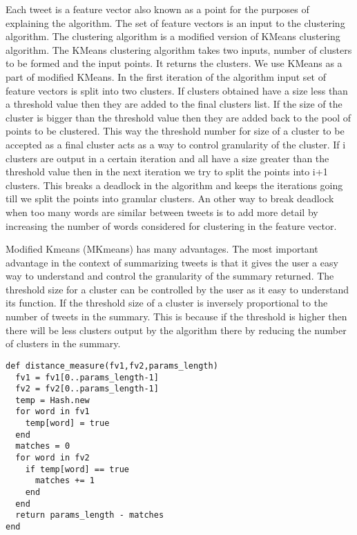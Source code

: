 Each tweet is a feature vector also known as a point for the purposes of explaining the algorithm. The set of feature vectors is an input to the clustering algorithm. The clustering algorithm is a modified version of KMeans clustering algorithm. The KMeans clustering algorithm takes two inputs, number of clusters to be formed and the input points. It returns the clusters. We use KMeans as a part of modified KMeans. In the first iteration of the algorithm input set of feature vectors is split into two clusters. If clusters obtained have a size less than a threshold value then they are added to the final clusters list. If the size of the cluster is bigger than the threshold value then they are added back to the pool of points to be clustered. This way the threshold number for size of a cluster to be accepted as a final cluster acts as a way to control granularity of the cluster.  If i clusters are output in a certain iteration and all have a size greater than the threshold value then in the next iteration we try to split the points into i+1 clusters. This breaks a deadlock in the algorithm and keeps the iterations going till we split the points into granular clusters. An other way to break deadlock when too many words are similar between tweets is to add more detail by increasing the number of words considered for clustering in the feature vector. 

Modified Kmeans (MKmeans) has many advantages. The most important advantage in the context of summarizing tweets is that it gives the user a easy way to understand and control the granularity of the summary returned. The threshold size for a cluster can be controlled by the user as it easy to understand its function. If the threshold size of a cluster is inversely proportional to the number of tweets in the summary. This is because if the threshold is higher then there will be less clusters output by the algorithm there by reducing the number of clusters in the summary.

\begin{lstlisting}
def distance_measure(fv1,fv2,params_length)
  fv1 = fv1[0..params_length-1]
  fv2 = fv2[0..params_length-1]
  temp = Hash.new
  for word in fv1
    temp[word] = true
  end
  matches = 0
  for word in fv2
    if temp[word] == true
      matches += 1
    end
  end
  return params_length - matches
end
\end{lstlisting}

